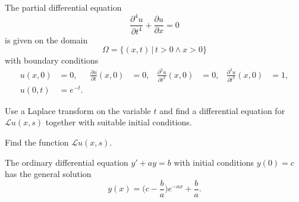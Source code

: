 The partial differential equation
\begin{equation}
\frac{\partial^4 u}{\partial t^4}
+
\frac{\partial u}{\partial x}
=
0
\label{50000013:dgl}
\end{equation}
is given on the domain
\[
\Omega = \{ (x,t)\,|\, t>0\wedge x > 0\}
\]
with boundary conditions
\begin{equation}
\begin{aligned}
u(x,0)&=0,
&
\frac{\partial u}{\partial t}(x,0)
&=
0,
&
\frac{\partial^2 u}{\partial t^2}(x,0)
&=
0,
&
\frac{\partial^3 u}{\partial t^3}(x,0)
&=1,
\\
u(0,t)&=e^{-t}.
\end{aligned}
\end{equation}
\begin{teilaufgaben}
\item
Use a Laplace transform on the variable $t$ and find a differential
equation for
$\mathscr{L}u(x,s)$ together with suitable initial conditions.
\item
Find the function $\mathscr{L}u(x,s)$.
\end{teilaufgaben}

\begin{hinweis}
The ordinary differential equation $y'+ay=b$ with initial conditions
$y(0)=c$ has the general solution
\[
y(x) = \biggl(c-\frac{b}{a}\biggr)e^{-ax} + \frac{b}{a}.
\]
\end{hinweis}

